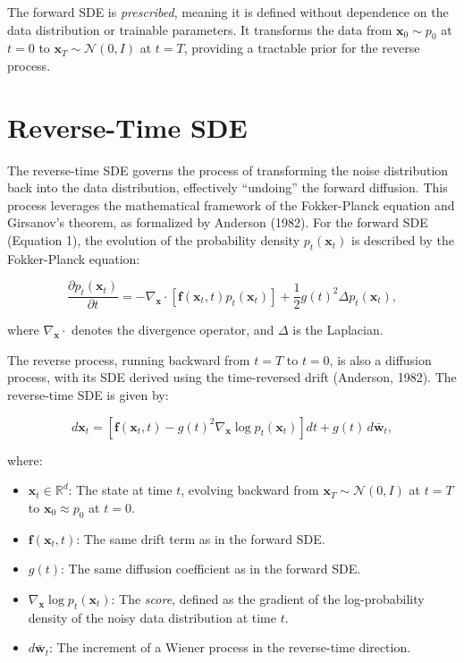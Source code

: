 \documentclass[12pt]{article}
\begin{document}
The forward SDE is \textit{prescribed}, meaning it is defined without dependence on the data distribution or trainable parameters. It transforms the data from $\mathbf{x}_0 \sim p_0$ at $t=0$ to $\mathbf{x}_T \sim \mathcal{N}(0, I)$ at $t=T$, providing a tractable prior for the reverse process.

\section{Reverse-Time SDE}

The reverse-time SDE governs the process of transforming the noise distribution back into the data distribution, effectively ``undoing'' the forward diffusion. This process leverages the mathematical framework of the Fokker-Planck equation and Girsanov’s theorem, as formalized by Anderson (1982). For the forward SDE (Equation 1), the evolution of the probability density $p_t(\mathbf{x}_t)$ is described by the Fokker-Planck equation:

\begin{equation}
    \frac{\partial p_t(\mathbf{x}_t)}{\partial t} = -\nabla_{\mathbf{x}} \cdot \left[ \mathbf{f}(\mathbf{x}_t, t) p_t(\mathbf{x}_t) \right] + \frac{1}{2} g(t)^2 \Delta p_t(\mathbf{x}_t),
\end{equation}

where $\nabla_{\mathbf{x}} \cdot$ denotes the divergence operator, and $\Delta$ is the Laplacian.

The reverse process, running backward from $t=T$ to $t=0$, is also a diffusion process, with its SDE derived using the time-reversed drift (Anderson, 1982). The reverse-time SDE is given by:

\begin{equation}
    d\mathbf{x}_t = \left[ \mathbf{f}(\mathbf{x}_t, t) - g(t)^2 \nabla_{\mathbf{x}} \log p_t(\mathbf{x}_t) \right] dt + g(t) \, d\bar{\mathbf{w}}_t,
\end{equation}

where:
\begin{itemize}
    \item $\mathbf{x}_t \in \mathbb{R}^d$: The state at time $t$, evolving backward from $\mathbf{x}_T \sim \mathcal{N}(0, I)$ at $t=T$ to $\mathbf{x}_0 \approx p_0$ at $t=0$.
    \item $\mathbf{f}(\mathbf{x}_t, t)$: The same drift term as in the forward SDE.
    \item $g(t)$: The same diffusion coefficient as in the forward SDE.
    \item $\nabla_{\mathbf{x}} \log p_t(\mathbf{x}_t)$: The \textit{score}, defined as the gradient of the log-probability density of the noisy data distribution at time $t$.
    \item $d\bar{\mathbf{w}}_t$: The increment of a Wiener process in the reverse-time direction.
\end{itemize}
\end{document}
